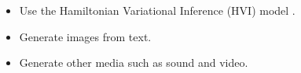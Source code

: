 \documentclass[landscape,a0b,final,a4resizeable]{include/a0poster}
\begin{document}
\begin{poster}
\begin{multicols}{3}
\vspace{1.cm}
	\begin{itemize}
		\setlength\itemsep{0.4em}
		\item Use the Hamiltonian Variational Inference (HVI) model \cite{2014arXiv1410.6460S}.
		\item Generate images from text.
		\item Generate other media such as sound and video.
 	\end{itemize}


		

\vspace{1.cm}

\small
\begingroup
\renewcommand{\section}[2]{}%

\endgroup



\end{multicols}
\end{poster}
\end{document}

